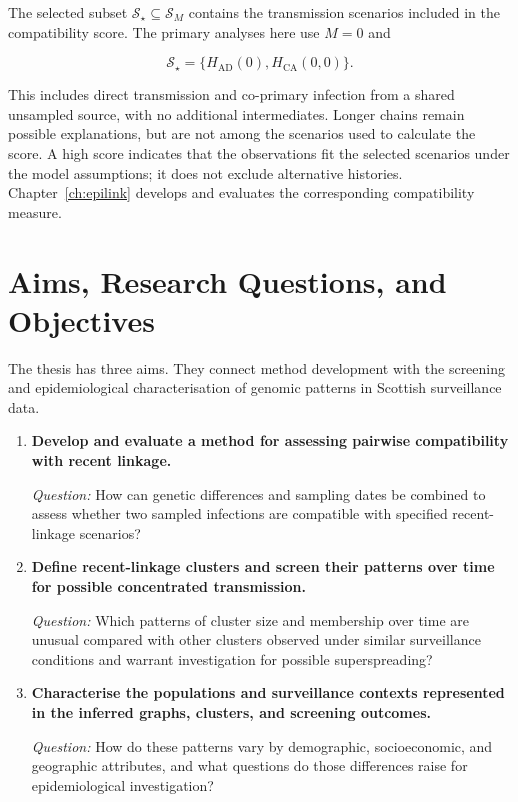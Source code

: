 The selected subset $\mathcal{S}_\star \subseteq \mathcal{S}_M$ contains the transmission scenarios included in the compatibility score. The primary analyses here use $M=0$ and

\[
    \mathcal{S}_\star =
    \bigl\{H_{\mathrm{AD}}(0), H_{\mathrm{CA}}(0,0)\bigr\}.
\]

This includes direct transmission and co-primary infection from a shared unsampled source, with no additional intermediates. Longer chains remain possible explanations, but are not among the scenarios used to calculate the score. A high score indicates that the observations fit the selected scenarios under the model assumptions; it does not exclude alternative histories. Chapter~\ref{ch:epilink} develops and evaluates the corresponding compatibility measure.

\section{Aims, Research Questions, and Objectives}\label{sec:ch1_aims_questions_objectives}

The thesis has three aims. They connect method development with the screening and epidemiological characterisation of genomic patterns in Scottish surveillance data.

\begin{enumerate}[
    label=\textbf{\arabic*.},
    leftmargin=1.8em,
    labelsep=0.6em,
    topsep=0.5\baselineskip,
    itemsep=0.6\baselineskip,
    parsep=0.15\baselineskip,
    before=\raggedright%
]
    \item {\raggedright\bfseries Develop and evaluate a method for assessing pairwise compatibility with recent linkage.\par}\nopagebreak
    \textit{Question:} How can genetic differences and sampling dates be combined to assess whether two sampled infections are compatible with specified recent-linkage scenarios?

    \item {\raggedright\bfseries Define recent-linkage clusters and screen their patterns over time for possible concentrated transmission.\par}\nopagebreak
    \textit{Question:} Which patterns of cluster size and membership over time are unusual compared with other clusters observed under similar surveillance conditions and warrant investigation for possible superspreading?

    \item {\raggedright\bfseries Characterise the populations and surveillance contexts represented in the inferred graphs, clusters, and screening outcomes.\par}\nopagebreak
    \textit{Question:} How do these patterns vary by demographic, socioeconomic, and geographic attributes, and what questions do those differences raise for epidemiological investigation?
\end{enumerate}


